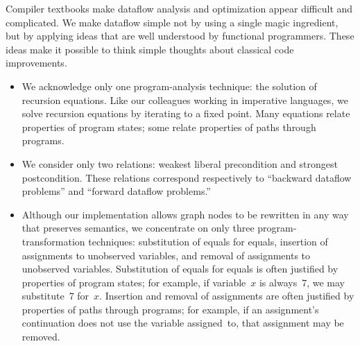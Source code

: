 \documentclass[blockstyle,preprint,nocopyrightspace]{sigplanconf}
\let\cite\citep
\newcommand{\authornote}[1]{{\em #1}}
\def\authornote#1{\unskip\relax}
\newcommand{\norman}[1]{\authornote{NR: #1}}
\let\remark\norman
\def\finalremark#1{\relax}
\newcommand\secref[1]{Section~\ref{sec:#1}}
\begin{document}
Compiler textbooks make dataflow analysis and optimization appear
difficult and complicated.
We make dataflow simple not by using a single magic
ingredient, but by applying ideas that are well understood by functional
programmers. %
These ideas
make it possible to think simple thoughts about classical code improvements.
\begin{itemize}
\item
We acknowledge only one program-analysis technique: the solution of
recursion equations.
Like our colleagues working in imperative languages, we solve
recursion equations by iterating to a fixed point.
Many equations relate
properties of program states; some relate properties of paths through
programs. 
\item
We consider only two
relations: weakest liberal precondition and strongest 
postcondition.
These relations correspond 
respectively
to
``backward dataflow problems'' and ``forward dataflow problems.''
\finalremark{Can we give an exmple of a property of program states which is
neither, just by way of contrast; ie this we cannot do.}
\item
Although our implementation allows graph nodes to be rewritten in any
way that preserves semantics, we concentrate on
only three program-transformation techniques:
substitution of equals for equals, 
insertion of assignments to unobserved variables, 
and removal of assignments to unobserved variables. 
Substitution of equals for equals is often justified by properties of program
states; for example, if variable~$x$
is always~7, we may substitute~7 for~$x$.\finalremark
{We can also justify substitution of \emph{labels} in goto
  statements by reasoning about continuations.  This is
  probably not the place to mention this fact.}
Insertion and removal of assignments are often justified by properties
of paths through programs;
for example, if an assignment's continuation does not use the variable
assigned~to, that assignment may be removed.


\end{itemize}
\end{document}
